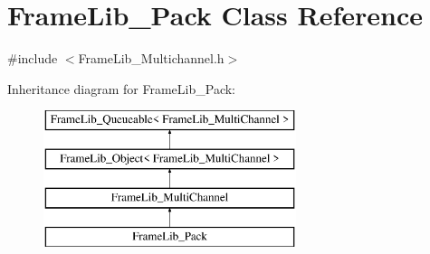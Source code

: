 \hypertarget{class_frame_lib___pack}{}\section{Frame\+Lib\+\_\+\+Pack Class Reference}
\label{class_frame_lib___pack}


{\ttfamily \#include $<$Frame\+Lib\+\_\+\+Multichannel.\+h$>$}

Inheritance diagram for Frame\+Lib\+\_\+\+Pack\+:\begin{figure}[H]
\begin{center}
\leavevmode
\includegraphics[height=4.000000cm]{class_frame_lib___pack}
\end{center}
\end{figure}
